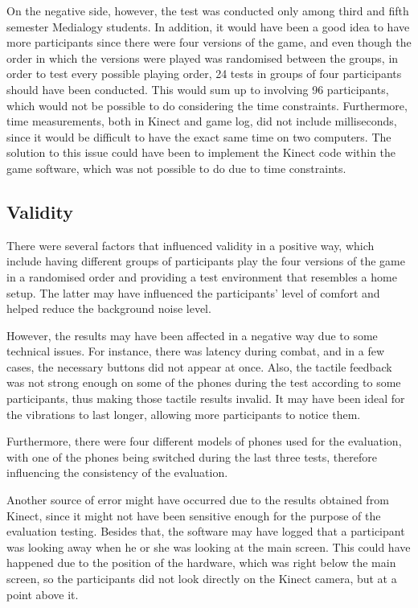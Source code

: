 On the negative side, however,  the test was conducted only among third and fifth semester Medialogy students. In addition, it would have been a good idea to have more participants since there were four versions of the game, and even though the order in which the versions were played was randomised between the groups, in order to test every possible playing order, 24 tests in groups of four participants should have been conducted. This would sum up to involving 96 participants, which would not be possible to do considering the time constraints. 
Furthermore, time measurements, both in Kinect and game log, did not include milliseconds, since it would be difficult to have the exact same time on two computers. The solution to this issue could have been to implement the Kinect code within the game software, which was not possible to do due to time constraints.

\subsection{Validity}
There were several factors that influenced validity in a positive way, which include having different groups of participants play the four versions of the game in a randomised order and providing a test environment that resembles a home setup. The latter may have influenced the participants’ level of comfort and helped reduce the background noise level. 

However, the results may have been affected in a negative way due to some technical issues. For instance, there was latency during combat, and in a few cases, the necessary buttons did not appear at once. Also, the tactile feedback was not strong enough on some of the phones during the test according to some participants, thus making those tactile results invalid. It may have been ideal for the vibrations to last longer, allowing more participants to notice them.

Furthermore, there were four different models of phones used for the evaluation, with one of the phones being switched during the last three tests, therefore influencing the consistency of the evaluation. 

Another source of error might have occurred due to the results obtained from Kinect, since it might not have been sensitive enough for the purpose of the evaluation testing. Besides that, the software may have logged that a participant was looking away when he or she was looking at the main screen. This could have happened due to the position of the hardware, which was right below the main screen, so the participants did not look directly on the Kinect camera, but at a point above it. 

